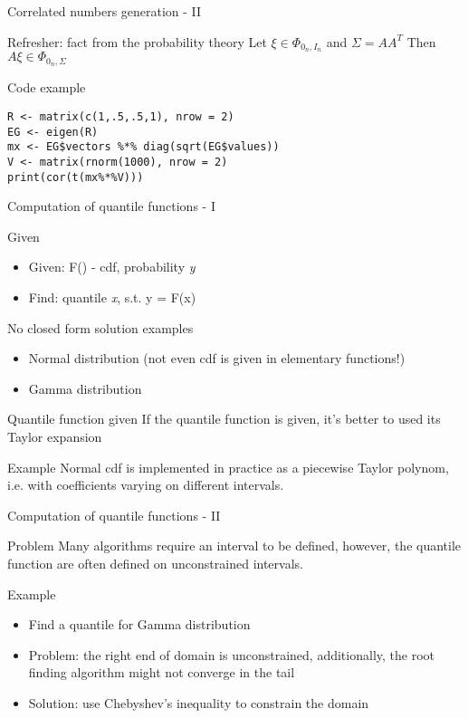 \documentclass[presentation]{beamer}
\begin{document}
\begin{frame}[fragile,label=sec-3-4]{Correlated numbers generation - II}
 \begin{block}{Refresher: fact from the probability theory}
Let $\xi \in \Phi_{0_n, I_n}$ and $\Sigma = AA^T$
Then $A\xi \in \Phi_{0_n, \Sigma}$
\end{block}
\begin{block}{Code example}
\begin{verbatim}
R <- matrix(c(1,.5,.5,1), nrow = 2)
EG <- eigen(R)
mx <- EG$vectors %*% diag(sqrt(EG$values))
V <- matrix(rnorm(1000), nrow = 2)
print(cor(t(mx%*%V)))
\end{verbatim}
\end{block}
\end{frame}
\begin{frame}[label=sec-3-5]{Computation of quantile functions - I}
\begin{block}{Given}
\begin{itemize}
\item Given: F() - cdf, probability \emph{y}
\item Find: quantile \emph{x}, s.t. y = F(x)
\end{itemize}
\end{block}
\begin{block}{No closed form solution examples}
\begin{itemize}
\item Normal distribution (not even cdf is given in elementary functions!)
\item Gamma distribution
\end{itemize}
\end{block}
\begin{block}{Quantile function given}
If the quantile function is given, it's better to used its Taylor expansion
\end{block}
\begin{block}{Example}
Normal cdf is implemented in practice as a piecewise Taylor polynom, i.e. with coefficients varying on different intervals.
\end{block}
\end{frame}
\begin{frame}[label=sec-3-6]{Computation of quantile functions - II}
\begin{block}{Problem}
Many algorithms require an interval to be defined, however, the quantile function are often defined on unconstrained intervals.
\end{block}
\begin{block}{Example}
\begin{itemize}
\item Find a quantile for Gamma distribution
\item Problem: the right end of domain is unconstrained, additionally, the root finding algorithm might not converge in the tail
\item Solution: use Chebyshev's inequality to constrain the domain
\end{itemize}
\end{block}
\end{frame}
\end{document}

